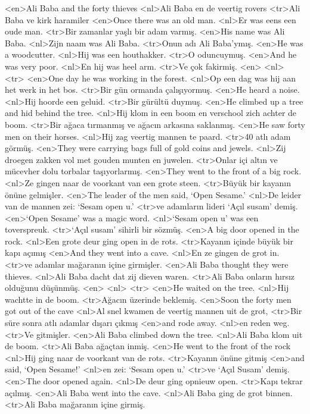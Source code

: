 <en>Ali Baba and the forty thieves 
<nl>Ali Baba en de veertig rovers 
<tr>Ali Baba ve kirk haramiler 
<en>Once there was an old man.
<nl>Er was eens een oude man. 
<tr>Bir zamanlar yaşlı bir adam varmış. 
<en>His name was Ali Baba.
<nl>Zijn naam was Ali Baba. 
<tr>Onun adı Ali Baba’ymış.
<en>He was a woodcutter.
<nl>Hij was een houthakker.
<tr>O oduncuymuş.
<en>And he was very poor.
<nl>En hij was heel arm.
<tr>Ve çok fakirmiş.
<en>
<nl>
<tr>
<en>One day he was working in the forest.
<nl>Op een dag was hij aan het werk in het bos. 
<tr>Bir gün ormanda çalışıyormuş.
<en>He heard a noise.
<nl>Hij hoorde een geluid. 
<tr>Bir gürültü duymuş.
<en>He climbed up a tree and hid behind the tree.
<nl>Hij klom in een boom en verschool zich achter de boom. 
<tr>Bir ağaca tırmanmış ve ağacın arkasına saklanmış.
<en>He saw forty men on their horses.
<nl>Hij zag veertig mannen te  paard.
<tr>40 atlı adam görmüş.
<en>They were carrying bags full of gold coins and jewels.
<nl>Zij droegen zakken vol met gouden munten en juwelen.
<tr>Onlar içi altın ve mücevher dolu torbalar taşıyorlarmış. 
<en>They went to the front of a big rock.
<nl>Ze gingen naar de voorkant van een grote steen. 
<tr>Büyük bir kayanın önüne gelmişler.
<en>The leader of the men said, `Open Sesame.'
<nl>De leider van de mannen zei: `Sesam open u.'
<tr>ve adamların lideri ‘Açıl susam’ demiş.
<en>`Open Sesame' was a magic word.
<nl>`Sesam open u' was een toverspreuk.
<tr>‘Açıl susam’ sihirli bir sözmüş.
<en>A big door opened in the rock.
<nl>Een grote deur ging open in de rots.
<tr>Kayanın içinde büyük bir kapı açımış
<en>And they went into a cave.
<nl>En ze gingen de grot in. 
<tr>ve adamlar mağaranın içine  girmişler.
<en>Ali Baba thought they were thieves.
<nl>Ali Baba dacht dat zij dieven waren.
<tr>Ali Baba onların hırsız olduğunu düşünmüş. 
<en>
<nl>
<tr>
<en>He waited  on the tree.
<nl>Hij wachtte in de boom. 
<tr>Ağacın üzerinde beklemiş.
<en>Soon the forty men got out of the cave
<nl>Al snel kwamen de veertig mannen uit de grot,
<tr>Bir süre sonra atlı adamlar dışarı çıkmış
<en>and rode away.
<nl>en reden weg. 
<tr>Ve gitmişler.
<en>Ali Baba climbed down the tree.
<nl>Ali Baba klom uit de boom.
<tr>Ali Baba ağaçtan inmiş.
<en>He went to the front of the rock
<nl>Hij ging naar de voorkant van de rots. 
<tr>Kayanın önüne gitmiş 
<en>and said, `Open Sesame!'
<nl>en zei: `Sesam open u.' 
<tr>ve `Açıl Susam’ demiş.
<en>The door opened again.
<nl>De deur ging opnieuw open.  
<tr>Kapı tekrar açılmış.
<en>Ali Baba went into the cave.
<nl>Ali Baba ging de grot binnen. 
<tr>Ali Baba mağaranın içine girmiş.
